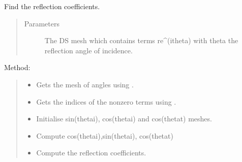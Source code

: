 \documentclass[letterpaper,10pt,english]{sphinxmanual}
\begin{document}

\begin{fulllineitems}
\label{\detokenize{index:DictionarySparseMatrix.ref_coef}}
Find the reflection coefficients.
\begin{quote}\begin{description}
\item[{Parameters}] \leavevmode
{} \textendash{} The DS mesh which contains terms re\textasciicircum{}(itheta) with theta   the reflection angle of incidence.

\end{description}\end{quote}

Method:
\begin{quote}
\begin{itemize}
\item {} 
Gets the mesh of angles using {\hyperref[\detokenize{index:DictionarySparseMatrix.DS}]{}}. 

\item {} 
Gets the indices of the nonzero terms using {\hyperref[\detokenize{index:DictionarySparseMatrix.DS}]{}}. 

\item {} 
Initialise sin(thetai), cos(thetai) and cos(thetat) meshes.

\item {} 
Compute cos(thetai),sin(thetai), cos(thetat)

\end{itemize}

\begin{sphinxVerbatim}[commandchars=\\\{\}]
\end{sphinxVerbatim}
\begin{itemize}
\item {} 
Compute the reflection coefficients.


\end{itemize}
\end{quote}
\end{fulllineitems}
\end{document}
